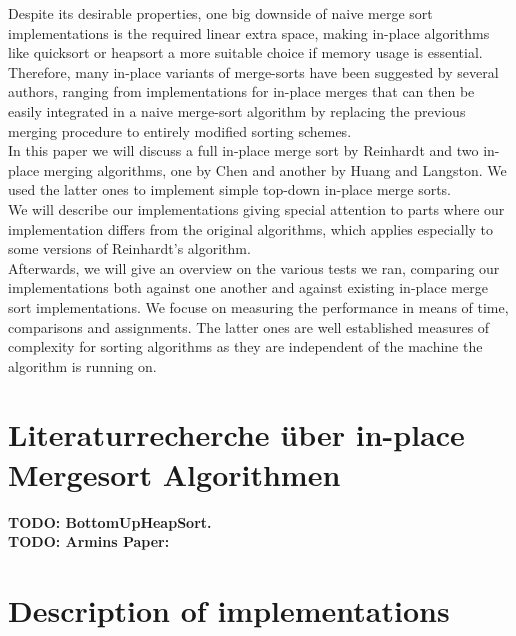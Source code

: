 \documentclass[11pt,pdftex,a4paper, twocolumn]{article}
\begin{document}
Despite its desirable properties, one big downside of naive merge sort implementations is the required linear extra space, making in-place algorithms like quicksort or heapsort a more suitable choice if memory usage is essential. \\
Therefore, many in-place variants of merge-sorts have been suggested by several authors, ranging from implementations for in-place merges that can then be easily integrated in a naive merge-sort algorithm by replacing the previous merging procedure to entirely modified sorting schemes. \\
In this paper we will discuss a full in-place merge sort by Reinhardt\cite{Reinhardt92} and two in-place merging algorithms, one by Chen\cite{Chen06} and another by Huang and Langston\cite{huang1988practical}. We used the latter ones to implement simple top-down in-place merge sorts. \\
We will describe our implementations giving special attention to parts where our implementation differs from the original algorithms, which applies especially to some versions of Reinhardt’s algorithm. \\
Afterwards, we will give an overview on the various tests we ran, comparing our implementations both against one another and against existing in-place merge sort implementations. We focuse on measuring the performance in means of time, comparisons and assignments. The latter ones are well established measures of complexity for sorting algorithms as they are independent of the machine the algorithm is running on. \\

\section*{Literaturrecherche \"uber in-place Mergesort Algorithmen}
\textbf{TODO: BottomUpHeapSort\cite{wegener1993bottom}.} \\
\textbf{TODO: Armins Paper:\cite{edelkamp2019worst}} \\

\section*{Description of implementations}
\end{document}

